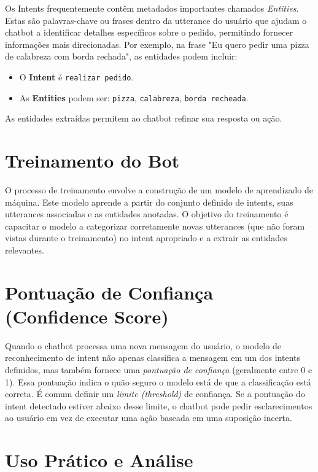 \documentclass[14pt,a4paper,oneside]{book}
\begin{document}
Os Intents frequentemente contêm metadados importantes chamados \textit{Entities}. Estas são palavras-chave ou frases dentro da utterance do usuário que ajudam o chatbot a identificar detalhes específicos sobre o pedido, permitindo fornecer informações mais direcionadas. Por exemplo, na frase "Eu quero pedir uma pizza de calabreza com borda rechada", as entidades podem incluir:
\begin{itemize}
	\item O \textbf{Intent} é \texttt{realizar pedido}.
	\item As \textbf{Entities} podem ser: \texttt{pizza}, \texttt{calabreza}, \texttt{borda recheada}.
\end{itemize}

As entidades extraídas permitem ao chatbot refinar sua resposta ou ação.

\section{Treinamento do Bot}
\label{sec:intents_treinamento}

O processo de treinamento envolve a construção de um modelo de aprendizado de máquina. Este modelo aprende a partir do conjunto definido de intents, suas utterances associadas e as entidades anotadas. O objetivo do treinamento é capacitar o modelo a categorizar corretamente novas utterances (que não foram vistas durante o treinamento) no intent apropriado e a extrair as entidades relevantes.

\section{Pontuação de Confiança (Confidence Score)}
\label{sec:intents_confianca}

Quando o chatbot processa uma nova mensagem do usuário, o modelo de reconhecimento de intent não apenas classifica a mensagem em um dos intents definidos, mas também fornece uma \textit{pontuação de confiança} (geralmente entre 0 e 1). Essa pontuação indica o quão seguro o modelo está de que a classificação está correta. É comum definir um \textit{limite (threshold)} de confiança. Se a pontuação do intent detectado estiver abaixo desse limite, o chatbot pode pedir esclarecimentos ao usuário em vez de executar uma ação baseada em uma suposição incerta.

\section{Uso Prático e Análise}
\label{sec:intents_uso_pratico}
\end{document}
